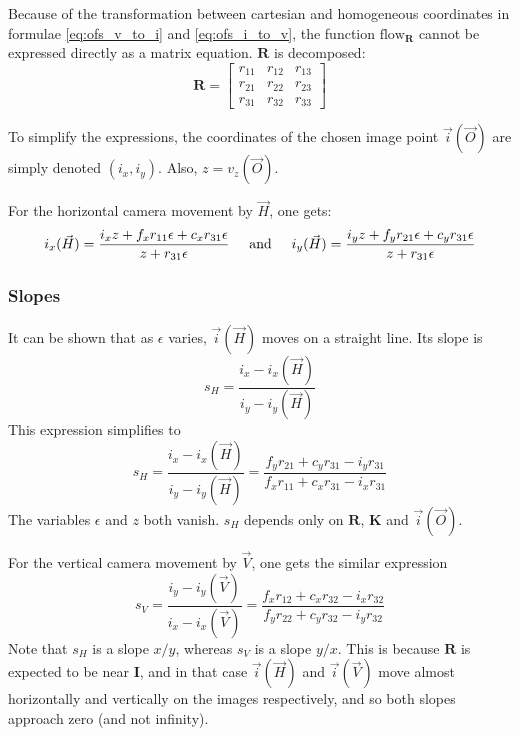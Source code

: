 \documentclass{scrreprt}
\newcommand{\matr}[1]{\mathbf{#1}}
\begin{document}
Because of the transformation between cartesian and homogeneous coordinates in formulae \ref{eq:ofs_v_to_i} and \ref{eq:ofs_i_to_v}, the function $\text{flow}_{\matr{R}}$ cannot be expressed directly as a matrix equation. $\matr{R}$ is decomposed:
\begin{equation}
\matr{R} = \begin{bmatrix}
	r_{11} & r_{12} & r_{13} \\
	r_{21} & r_{22} & r_{23} \\
	r_{31} & r_{32} & r_{33}
\end{bmatrix}
\end{equation}

To simplify the expressions, the coordinates of the chosen image point $\vec{i}(\vec{O})$ are simply denoted $(i_x, i_y)$. Also, $z = v_z(\vec{O})$.

For the horizontal camera movement by $\vec{H}$, one gets:
\begin{equation}
i_x(\vec{H}) = \frac{i_x z + f_x r_{11} \epsilon + c_x r_{31} \epsilon}{z + r_{31} \epsilon}
\hspace{5mm} \text{and} \hspace{5mm}
i_y(\vec{H}) = \frac{i_y z + f_y r_{21} \epsilon + c_y r_{31} \epsilon}{z + r_{31} \epsilon}
\end{equation}

\subsubsection{Slopes}
It can be shown that as $\epsilon$ varies, $\vec{i}(\vec{H})$ moves on a straight line. Its slope is
\begin{equation}
s_H = \frac{i_x - i_x(\vec{H})}{i_y - i_y(\vec{H})}
\end{equation}
This expression simplifies to
\begin{equation}
s_H = \frac{i_x - i_x(\vec{H})}{i_y - i_y(\vec{H})} = \frac{f_y r_{21} + c_y r_{31} - i_y r_{31}}{f_x r_{11} + c_x r_{31} - i_x r_{31}}
\end{equation}
The variables $\epsilon$ and $z$ both vanish. $s_H$ depends only on $\matr{R}$, $\matr{K}$ and $\vec{i}(\vec{O})$.

For the vertical camera movement by $\vec{V}$, one gets the similar expression
\begin{equation}
s_V = \frac{i_y - i_y(\vec{V})}{i_x - i_x(\vec{V})} = \frac{f_x r_{12} + c_x r_{32} - i_x r_{32}}{f_y r_{22} + c_y r_{32} - i_y r_{32}}
\end{equation}
Note that $s_H$ is a slope $x/y$, whereas $s_V$ is a slope $y/x$. This is because $\matr{R}$ is expected to be near $\matr{I}$, and in that case $\vec{i}(\vec{H})$ and $\vec{i}(\vec{V})$ move almost horizontally and vertically on the images respectively, and so both slopes approach zero (and not infinity).
\end{document}
